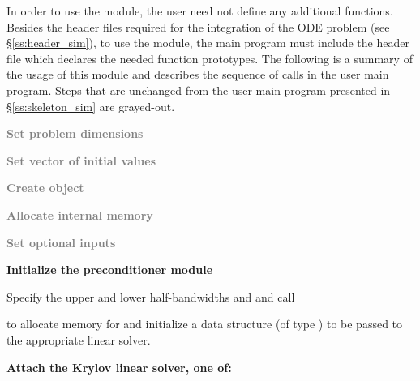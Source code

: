 In order to use the {\cvbandpre} module, the user need not define any
additional functions. 
Besides the header files required for the integration of the ODE problem
(see \S\ref{ss:header_sim}),  to use the {\cvbandpre} module, the main program 
must include the header file  which declares the needed
function prototypes.
The following is a summary of the usage of this module and describes the sequence
of calls in the user main program. Steps that are unchanged from the user main
program presented in \S\ref{ss:skeleton_sim} are grayed-out.
\begin{Steps}
  
\item
  \textcolor{gray}{\bf Set problem dimensions}

\item
  \textcolor{gray}{\bf Set vector of initial values}
 
\item
  \textcolor{gray}{\bf Create {\cvode} object}

\item
  \textcolor{gray}{\bf Allocate internal memory}

\item
  \textcolor{gray}{\bf Set optional inputs}

\item \label{i:bandpre_init}
  {\bf Initialize the {\cvbandpre} preconditioner module}

  Specify the upper and lower half-bandwidths  and  and call 


  to allocate memory for and initialize a data structure 
  (of type ) to be passed to the appropriate {\cvspils} linear solver.

\item \label{i:bandpre_attach}
  {\bf Attach the Krylov linear solver, one of:}





\end{Steps}

